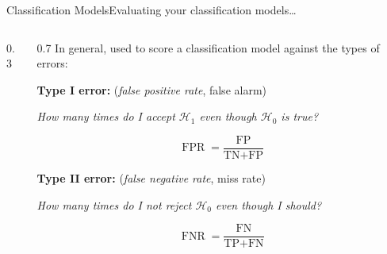 \begin{frame}{Classification Models}{Evaluating your classification models\dots}
    \vfill
    \begin{columns}[c]
        \begin{column}{0.3\textwidth}
            \centering
            
        \end{column}
        \hfil
        \begin{column}{0.7\textwidth}
            In general, used to score a classification model against the types of errors:

            \vspace{1em}

            \textbf{Type I error:} (\emph{false positive rate}, false alarm)
            \begin{center}
                \emph{How many times do I accept $\mathcal{H}_1$ even though $\mathcal{H}_0$ is true?}
            \end{center}
            \begin{equation*}
                \operatorname{FPR} = \frac{\text{FP}}{\text{TN} + \text{FP}}
            \end{equation*}

            \textbf{Type II error:} (\emph{false negative rate}, miss rate)
            \begin{center}
                \emph{How many times do I not reject $\mathcal{H}_0$ even though I should?}
            \end{center}
            \begin{equation*}
                \operatorname{FNR} = \frac{\text{FN}}{\text{TP} + \text{FN}}
            \end{equation*}
        \end{column}
    \end{columns}
    \vfill
\end{frame}

